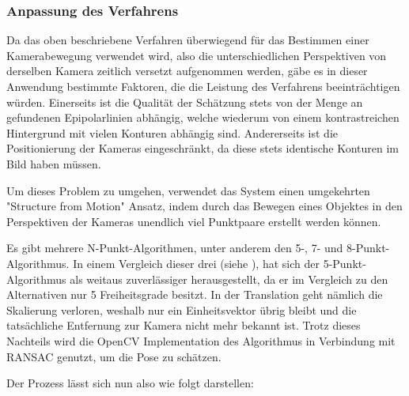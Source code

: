 \documentclass[12pt, ngerman]{article}
\begin{document}
\subsubsection{Anpassung des Verfahrens}
Da das oben beschriebene Verfahren überwiegend für das Bestimmen einer Kamerabewegung verwendet wird, also die unterschiedlichen Perspektiven von derselben Kamera zeitlich versetzt aufgenommen werden, gäbe es in dieser Anwendung bestimmte Faktoren, die die Leistung des Verfahrens beeinträchtigen würden.
Einerseits ist die Qualität der Schätzung stets von der Menge an gefundenen Epipolarlinien abhängig, welche wiederum von einem kontrastreichen Hintergrund mit vielen Konturen abhängig sind. Andererseits ist die Positionierung der Kameras eingeschränkt, da diese stets identische Konturen im Bild haben müssen.

Um dieses Problem zu umgehen, verwendet das System einen umgekehrten "Structure from Motion" Ansatz, indem durch das Bewegen eines Objektes in den Perspektiven der Kameras unendlich viel Punktpaare erstellt werden können. 

Es gibt mehrere N-Punkt-Algorithmen, unter anderem den 5-, 7- und 8-Punkt-Algorithmus. In einem Vergleich dieser drei (siehe \cite{github_odometry}), hat sich der 5-Punkt-Algorithmus als weitaus zuverlässiger herausgestellt, da er im Vergleich zu den Alternativen nur 5 Freiheitsgrade besitzt. In der Translation geht nämlich die Skalierung verloren, weshalb nur ein Einheitsvektor übrig bleibt und die tatsächliche Entfernung zur Kamera nicht mehr bekannt ist. Trotz dieses Nachteils wird die OpenCV Implementation des Algorithmus in Verbindung mit RANSAC genutzt, um die Pose zu schätzen.

\newpage
Der Prozess lässt sich nun also wie folgt darstellen:
\end{document}

